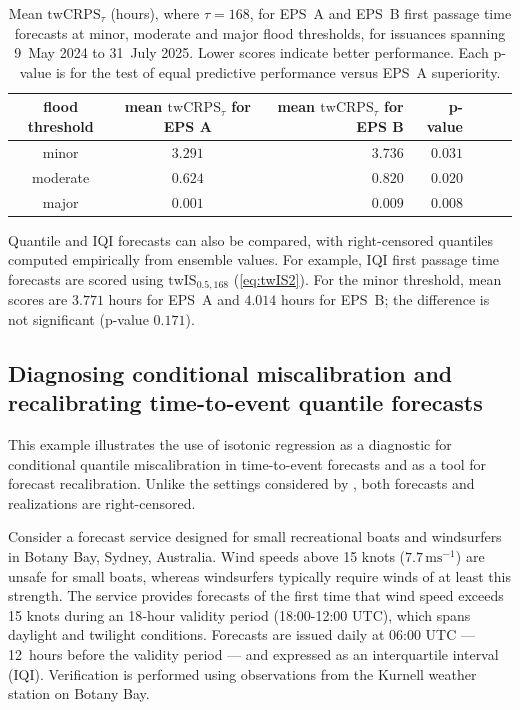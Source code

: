 \documentclass[10pt]{article} %
\theoremstyle{theorem}
\theoremstyle{definition}
\newcommand{\twCRPS}{\mathrm{twCRPS}}
\newcommand{\twIS}{\mathrm{twIS}}
\begin{document}
\begin{table}[t!]
    \renewcommand{\arraystretch}{1.2} %
    \centering  \scriptsize
    \begin{tabular}{|c|c|r|r|r|r|r|}
    \hline
        flood threshold & mean $\twCRPS_\tau$ for EPS A & mean $\twCRPS_\tau$ for EPS B & p-value  \\ \hline
        minor & $3.291$ & $3.736$ & $0.031$ \\ 
        moderate & $0.624$ & $0.820$ & $0.020$  \\ 
        major & $0.001$ & $0.009$ & $0.008$ \\ \hline
    \end{tabular}
    \caption{Mean $\twCRPS_\tau$ (hours), where $\tau=168$, for EPS~A and EPS~B first passage time forecasts at minor, moderate and major flood thresholds, for issuances spanning 9~May 2024 to 31~July 2025. Lower scores indicate better performance. Each p-value is for the test of equal predictive performance versus EPS~A superiority.}
     \label{tab:twcrps hydro results}
\end{table}

Quantile and IQI forecasts can also be compared, with right-censored quantiles computed empirically from ensemble values. For example, IQI first passage time forecasts are scored using $\twIS_{0.5,168}$ (\ref{eq:twIS2}).  For the minor threshold, mean scores are $3.771$ hours for EPS~A and $4.014$ hours for EPS~B; the difference is not significant (p-value $0.171$).


\subsection{Diagnosing conditional miscalibration and recalibrating time-to-event quantile forecasts}\label{ss:calibration}

This example illustrates the use of isotonic regression as a diagnostic for conditional quantile miscalibration \citep{gneiting2023regression, gneiting2023model} in time-to-event forecasts and as a tool for forecast recalibration. Unlike the settings considered by \citet{gneiting2023regression}, both forecasts and realizations are right-censored.

Consider a forecast service designed for small recreational boats and windsurfers in Botany Bay, Sydney, Australia. Wind speeds above 15 knots ($7.7\,\mathrm{ms}^{-1}$) are unsafe for small boats, whereas windsurfers typically require winds of at least this strength. The service provides forecasts of the first time that wind speed exceeds 15 knots during an 18‑hour validity period (18:00-12:00 UTC), which spans daylight and twilight conditions. Forecasts are issued daily at 06:00 UTC --- 12~hours before the validity period --- and expressed as an interquartile interval (IQI). Verification is performed using observations from the Kurnell weather station on Botany Bay.
\end{document}
